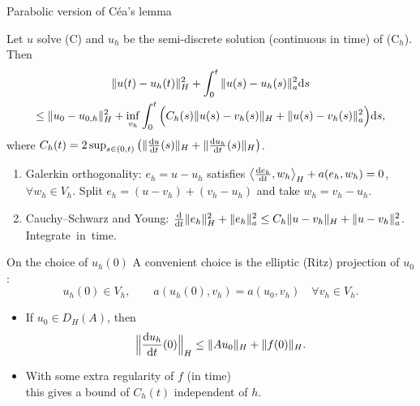\begin{frame}{Parabolic version of Céa's lemma}
  \small
  \begin{theorem}
    Let $u$ solve (C) and $u_h$ be the semi-discrete solution (continuous in time) of (C$_h$). Then
    \begin{multline*}
      \|u(t) - u_h(t)\|_H^2 + \int_0^t \|u(s) - u_h(s)\|_a^2 {\mathrm d} s \\
      \le \|u_0 - u_{0,h}\|_H^2 + \inf_{v_h} \int_0^t \Big( C_h(s) \|u(s) - v_h(s)\|_H + \|u(s) - v_h(s)\|_a^2 \Big) {\mathrm d} s,
    \end{multline*}
    where $C_h(t) = 2 \sup_{s \in (0,t)} \big( \|\tfrac{{\mathrm d} u}{{\mathrm d} t}(s)\|_H + \|\tfrac{{\mathrm d} u_h}{{\mathrm d} t}(s)\|_H\big)$.
  \end{theorem}
  \begin{proofsteps}
    \begin{enumerate}
      \item Galerkin orthogonality: $e_h = u - u_h$ satisfies $\left\langle \frac{{\mathrm d} e_h}{{\mathrm d} t}, w_h \right\rangle_H + a(e_h, w_h) = 0$, $\forall w_h \in V_h$.
            Split $e_h = (u - v_h) + (v_h - u_h)$ and take $w_h = v_h - u_h$.
      \item Cauchy--Schwarz and Young: $\frac{{\mathrm d}}{{\mathrm d} t}\|e_h\|_H^2 + \|e_h\|_a^2 \le C_h \|u - v_h\|_H + \|u - v_h\|_a^2$. \mbox{Integrate in time.}
    \end{enumerate}
  \end{proofsteps}
\end{frame}

\begin{frame}{On the choice of $u_h(0)$}
  A convenient choice is the \alert{elliptic (Ritz) projection} of $u_0$:
  \[
    u_h(0) \in V_h, \qquad a(u_h(0), v_h) = a(u_0, v_h) \quad \forall v_h \in V_h.
  \]
  \begin{itemize}
    \item If $u_0 \in D_H(A)$, then
          \[
            \Big\|\frac{{\mathrm d} u_h}{{\mathrm d} t}(0)\Big\|_H \le \|Au_0\|_H + \|f(0)\|_H .
          \]
    \item With some extra regularity of $f$ (in time)\\ this gives a bound of $C_h(t)$ \alert{independent of $h$}.
  \end{itemize}
\end{frame}

